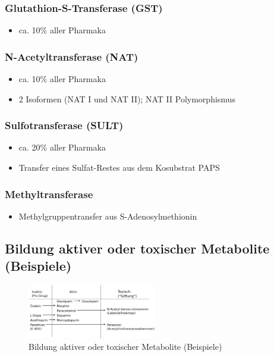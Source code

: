 \documentclass[10pt,a4paper]{report}
\begin{document}
\subsubsection{Glutathion-S-Transferase (GST)}

\begin{itemize}
	\item ca. 10\% aller Pharmaka
\end{itemize}

\subsubsection{N-Acetyltransferase (NAT) }

\begin{itemize}
	\item ca. 10\% aller Pharmaka
	\item 2 Isoformen (NAT I und NAT II); NAT II Polymorphismus
\end{itemize}

\subsubsection{Sulfotransferase (SULT)}

\begin{itemize}
	\item ca. 20\% aller Pharmaka
	\item Transfer eines Sulfat-Restes aus dem Kosubstrat PAPS
\end{itemize}

\subsubsection{Methyltransferase}

\begin{itemize}
	\item Methylgruppentransfer aus S-Adenosylmethionin
\end{itemize}

\subsection{Bildung aktiver oder toxischer Metabolite (Beispiele)}

\begin{figure}[h]
	\centering 
	\includegraphics[width=0.5\textwidth]{Bilder/Pharmakodynamik.png} 
	\caption{Bildung aktiver oder toxischer Metabolite (Beispiele)} 
	\label{fig:Metabolite}
\end{figure}
\end{document}
